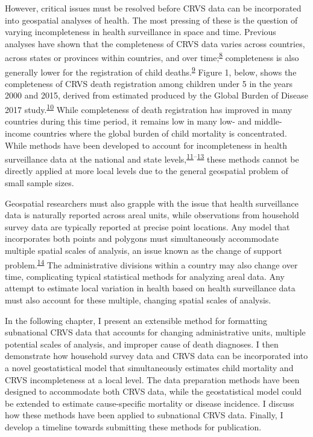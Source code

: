 \documentclass[
]{article}
\begin{document}
However, critical issues must be resolved before CRVS data can be incorporated into geospatial analyses of health. The most pressing of these is the question of varying incompleteness in health surveillance in space and time. Previous analyses have shown that the completeness of CRVS data varies across countries, across states or provinces within countries, and over time;\textsuperscript{\protect\hyperlink{ref-Adair2018}{8}} completeness is also generally lower for the registration of child deaths.\textsuperscript{\protect\hyperlink{ref-Malqvist2008}{9}} Figure 1, below, shows the completeness of CRVS death registration among children under 5 in the years 2000 and 2015, derived from estimated produced by the Global Burden of Disease 2017 study.\textsuperscript{\protect\hyperlink{ref-Dicker2018}{10}} While completeness of death registration has improved in many countries during this time period, it remains low in many low- and middle- income countries where the global burden of child mortality is concentrated. While methods have been developed to account for incompleteness in health surveillance data at the national and state levels,\textsuperscript{\protect\hyperlink{ref-Murray2010}{11}--\protect\hyperlink{ref-Bhat2002}{13}} these methods cannot be directly applied at more local levels due to the general geospatial problem of small sample sizes.

Geospatial researchers must also grapple with the issue that health surveillance data is naturally reported across areal units, while observations from household survey data are typically reported at precise point locations. Any model that incorporates both points and polygons must simultaneously accommodate multiple spatial scales of analysis, an issue known as the change of support problem.\textsuperscript{\protect\hyperlink{ref-Gelfand2010}{14}} The administrative divisions within a country may also change over time, complicating typical statistical methods for analyzing areal data. Any attempt to estimate local variation in health based on health surveillance data must also account for these multiple, changing spatial scales of analysis.

In the following chapter, I present an extensible method for formatting subnational CRVS data that accounts for changing administrative units, multiple potential scales of analysis, and improper cause of death diagnoses. I then demonstrate how household survey data and CRVS data can be incorporated into a novel geostatistical model that simultaneously estimates child mortality and CRVS incompleteness at a local level. The data preparation methods have been designed to accommodate both CRVS data, while the geostatistical model could be extended to estimate cause-specific mortality or disease incidence. I discuss how these methods have been applied to subnational CRVS data. Finally, I develop a timeline towards submitting these methods for publication.
\end{document}
